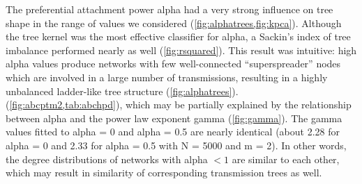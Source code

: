 The preferential attachment power \gls{alpha} had a very strong influence on
tree shape in the range of values we considered
(\cref{fig:alphatrees,fig:kpca}). Although the tree kernel was the most
effective classifier for \gls{alpha}, a Sackin's index of tree imbalance
performed nearly as well (\cref{fig:rsquared}). This result was intuitive: high
\gls{alpha} values produce networks with few well-connected ``superspreader''
nodes which are involved in a large number of transmissions, resulting in a
highly unbalanced ladder-like tree structure (\cref{fig:alphatrees}). 
 
(\cref{fig:abcptm2,tab:abchpd}), which may be partially explained by the
relationship between \gls{alpha} and the power law exponent \gls{gamma}
(\cref{fig:gamma}).  The \gls{gamma} values fitted to \gls{alpha} = 0
and \gls{alpha} = 0.5 are nearly identical (about 2.28 for \gls{alpha} = 0 and
2.33 for \gls{alpha} = 0.5 with \gls{N} = 5000 and \gls{m} = 2). In other
words, the degree distributions of networks with \gls{alpha} $< 1$ are similar
to each other, which may result in similarity of corresponding transmission
trees as well. 

